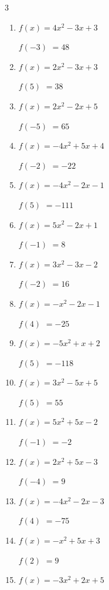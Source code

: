 \begin{multicols}{3}
\begin{enumerate}
$f(-1)$
        $= -7$

\columnbreak %

\resetques

  \item $f(x)=4x^{2}-3x+3$

$f(-3)$
        $= 48$

  \item $f(x)=2x^{2}-3x+3$

$f(5)$
        $= 38$

  \item $f(x)=2x^{2}-2x+5$

$f(-5)$
        $= 65$

  \item $f(x)=-4x^{2}+5x+4$

$f(-2)$
        $= -22$

  \item $f(x)=-4x^{2}-2x-1$

$f(5)$
        $= -111$

  \item $f(x)=5x^{2}-2x+1$

$f(-1)$
        $= 8$

  \item $f(x)=3x^{2}-3x-2$

$f(-2)$
        $= 16$

  \item $f(x)=-x^{2}-2x-1$

$f(4)$
        $= -25$

  \item $f(x)=-5x^{2}+x+2$

$f(5)$
        $= -118$

  \item $f(x)=3x^{2}-5x+5$

$f(5)$
        $= 55$

  \item $f(x)=5x^{2}+5x-2$

$f(-1)$
        $= -2$

  \item $f(x)=2x^{2}+5x-3$

$f(-4)$
        $= 9$

  \item $f(x)=-4x^{2}-2x-3$

$f(4)$
        $= -75$

  \item $f(x)=-x^{2}+5x+3$

$f(2)$
        $= 9$

  \item $f(x)=-3x^{2}+2x+5$


\end{enumerate}
\end{multicols}
